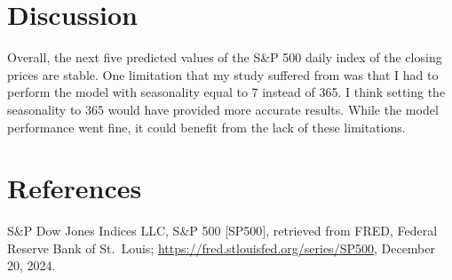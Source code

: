 \documentclass[
  man]{apa6}
\begin{document}
\section{Discussion}\label{discussion}

Overall, the next five predicted values of the S\&P 500 daily index of the closing prices are stable. One limitation that my study suffered from was that I had to perform the model with seasonality equal to 7 instead of 365. I think setting the seasonality to 365 would have provided more accurate results. While the model performance went fine, it could benefit from the lack of these limitations.

\newpage

\section{References}\label{references}

S\&P Dow Jones Indices LLC, S\&P 500 {[}SP500{]}, retrieved from FRED, Federal Reserve Bank of St.~Louis; \url{https://fred.stlouisfed.org/series/SP500}, December 20, 2024.
\end{document}
